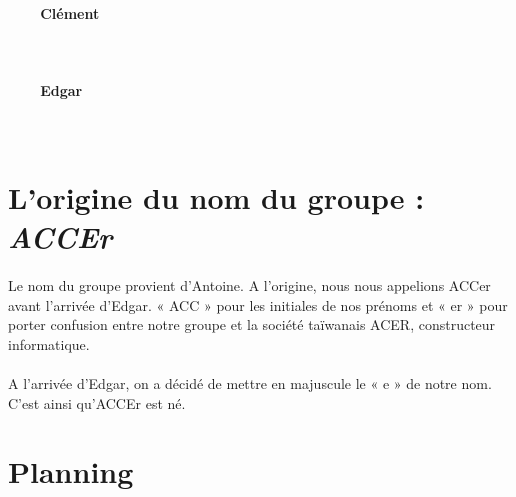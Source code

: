 \documentclass[titlepage, 13px, a4paper]{report}
\begin{document}
\paragraph{~~~~Clément} \hspace{0pt} \\


\paragraph{~~~~Edgar} \hspace{0pt} \\



\section{L'origine du nom du groupe : \textit{ACCEr}}
\paragraph{} \hspace{0pt}
Le nom du groupe provient d’Antoine. A l’origine, nous nous appelions ACCer avant l’arrivée d’Edgar. 
« ACC » pour les initiales de nos prénoms et « er » pour porter confusion entre notre groupe 
et la société taïwanais ACER, constructeur informatique. \\ \\
A l’arrivée d’Edgar, on a décidé de mettre en majuscule le « e » de notre nom. \\
C’est ainsi qu’ACCEr est né.

\newpage

\section{Planning}
\end{document}
